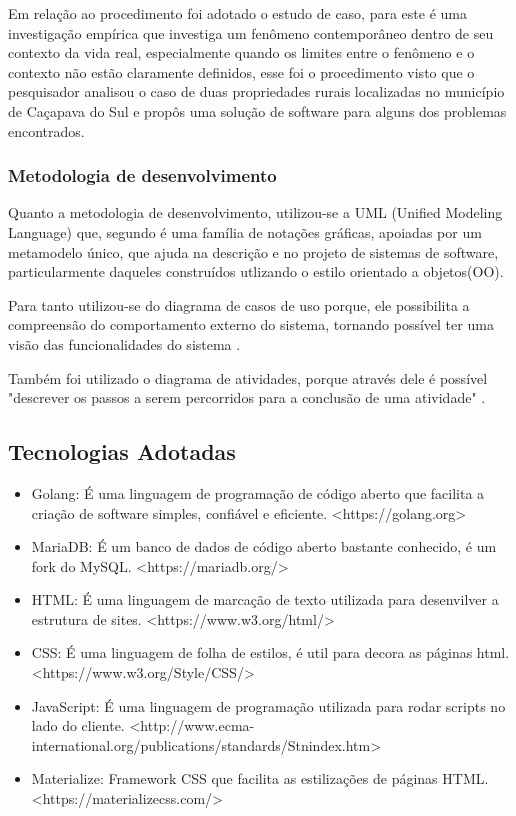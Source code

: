 \documentclass[12pt]{article}
\begin{document}
Em relação ao procedimento foi adotado o estudo de caso, para  este é uma investigação empírica que investiga um fenômeno contemporâneo dentro de seu contexto da vida real, especialmente quando os limites entre o fenômeno e o contexto não estão claramente definidos, esse foi o procedimento visto que o pesquisador analisou o caso de duas propriedades rurais localizadas no município de Caçapava do Sul e propôs uma solução de software para alguns dos problemas encontrados.

\subsubsection{Metodologia de desenvolvimento}

Quanto a metodologia de desenvolvimento, utilizou-se a UML (Unified Modeling Language) que, segundo  é uma família de notações gráficas, apoiadas por um metamodelo único, que ajuda na descrição e no projeto de sistemas de software, particularmente daqueles construídos utlizando o estilo orientado a objetos(OO).

Para tanto utilizou-se do diagrama de casos de uso porque, ele possibilita a compreensão do comportamento externo do sistema, tornando possível ter uma visão das funcionalidades do sistema \cite{guedes18}.

Também foi utilizado o diagrama de atividades, porque através dele é possível "descrever os passos a serem percorridos para a conclusão de uma atividade" \cite{guedes18}.

\subsection{Tecnologias Adotadas}

\begin{itemize}
	\item Golang: É uma linguagem de programação de código aberto que facilita a criação de software simples, confiável e eficiente. <https://golang.org>	
	\item MariaDB: É um banco de dados de código aberto bastante conhecido, é um fork do MySQL. <https://mariadb.org/>
	\item HTML: É uma linguagem de marcação de texto utilizada para desenvilver a estrutura de sites. <https://www.w3.org/html/>
	\item CSS: É uma linguagem de folha de estilos, é util para decora as páginas html. <https://www.w3.org/Style/CSS/>
	\item JavaScript: É uma linguagem de programação utilizada para rodar scripts no lado do cliente. <http://www.ecma-international.org/publications/standards/Stnindex.htm>
	\item Materialize: Framework CSS que facilita as estilizações de páginas HTML. <https://materializecss.com/>
\end{itemize}
\end{document}
